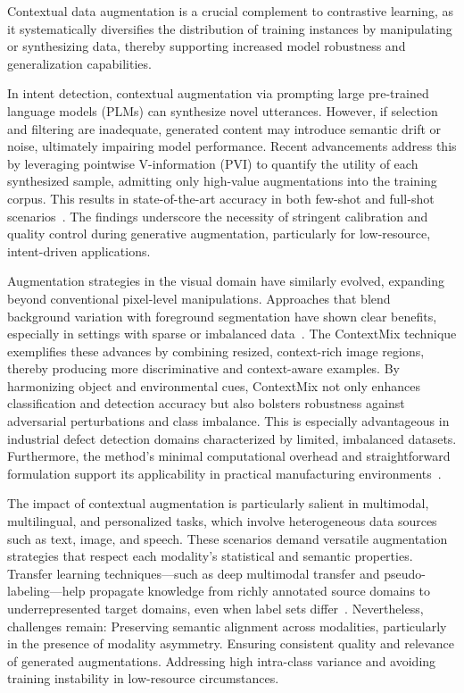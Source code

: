 \documentclass[sigconf]{acmart}
\begin{document}
Contextual data augmentation is a crucial complement to contrastive learning, as it systematically diversifies the distribution of training instances by manipulating or synthesizing data, thereby supporting increased model robustness and generalization capabilities.

In intent detection, contextual augmentation via prompting large pre-trained language models (PLMs) can synthesize novel utterances. However, if selection and filtering are inadequate, generated content may introduce semantic drift or noise, ultimately impairing model performance. Recent advancements address this by leveraging pointwise V-information (PVI) to quantify the utility of each synthesized sample, admitting only high-value augmentations into the training corpus. This results in state-of-the-art accuracy in both few-shot and full-shot scenarios~\cite{ref61}. The findings underscore the necessity of stringent calibration and quality control during generative augmentation, particularly for low-resource, intent-driven applications.

Augmentation strategies in the visual domain have similarly evolved, expanding beyond conventional pixel-level manipulations. Approaches that blend background variation with foreground segmentation have shown clear benefits, especially in settings with sparse or imbalanced data~\cite{ref62}. The ContextMix technique exemplifies these advances by combining resized, context-rich image regions, thereby producing more discriminative and context-aware examples. By harmonizing object and environmental cues, ContextMix not only enhances classification and detection accuracy but also bolsters robustness against adversarial perturbations and class imbalance. This is especially advantageous in industrial defect detection domains characterized by limited, imbalanced datasets. Furthermore, the method's minimal computational overhead and straightforward formulation support its applicability in practical manufacturing environments~\cite{ref60}.

The impact of contextual augmentation is particularly salient in multimodal, multilingual, and personalized tasks, which involve heterogeneous data sources such as text, image, and speech. These scenarios demand versatile augmentation strategies that respect each modality's statistical and semantic properties. Transfer learning techniques—such as deep multimodal transfer and pseudo-labeling—help propagate knowledge from richly annotated source domains to underrepresented target domains, even when label sets differ~\cite{ref14,ref15,ref19,ref20,ref23,ref24,ref28,ref29,ref30,ref31,ref33,ref36,ref37,ref38,ref39,ref43,ref45,ref48,ref54,ref55,ref61,ref62}. Nevertheless, challenges remain:
Preserving semantic alignment across modalities, particularly in the presence of modality asymmetry.
Ensuring consistent quality and relevance of generated augmentations.
Addressing high intra-class variance and avoiding training instability in low-resource circumstances.
\end{document}
